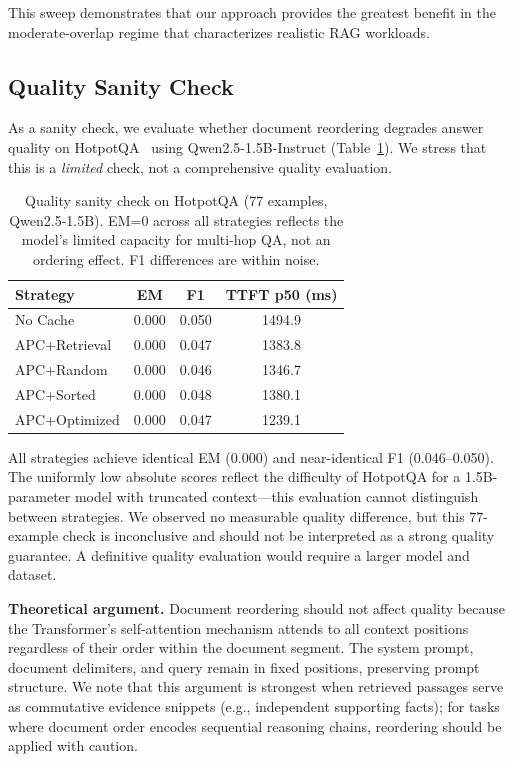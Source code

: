 \documentclass{article}
\begin{document}
This sweep demonstrates that our approach provides the greatest benefit in the moderate-overlap regime that characterizes realistic RAG workloads.

\subsection{Quality Sanity Check}

As a sanity check, we evaluate whether document reordering degrades answer quality on HotpotQA~\citep{yang2018hotpotqa} using Qwen2.5-1.5B-Instruct (Table~\ref{tab:quality}). We stress that this is a \emph{limited} check, not a comprehensive quality evaluation.

\begin{table}[t]
\caption{Quality sanity check on HotpotQA (77 examples, Qwen2.5-1.5B). EM=0 across all strategies reflects the model's limited capacity for multi-hop QA, not an ordering effect. F1 differences are within noise.}
\label{tab:quality}
\centering
\small
\begin{tabular}{@{}lccc@{}}
\toprule
\textbf{Strategy} & \textbf{EM} & \textbf{F1} & \textbf{TTFT p50 (ms)} \\
\midrule
No Cache      & 0.000 & 0.050 & 1494.9 \\
APC+Retrieval & 0.000 & 0.047 & 1383.8 \\
APC+Random    & 0.000 & 0.046 & 1346.7 \\
APC+Sorted    & 0.000 & 0.048 & 1380.1 \\
APC+Optimized & 0.000 & 0.047 & 1239.1 \\
\bottomrule
\end{tabular}
\vspace{-0.5em}
\end{table}

All strategies achieve identical EM (0.000) and near-identical F1 (0.046--0.050). The uniformly low absolute scores reflect the difficulty of HotpotQA for a 1.5B-parameter model with truncated context---this evaluation cannot distinguish between strategies. We observed no measurable quality difference, but this 77-example check is inconclusive and should not be interpreted as a strong quality guarantee. A definitive quality evaluation would require a larger model and dataset.

\textbf{Theoretical argument.} Document reordering should not affect quality because the Transformer's self-attention mechanism attends to all context positions regardless of their order within the document segment. The system prompt, document delimiters, and query remain in fixed positions, preserving prompt structure. We note that this argument is strongest when retrieved passages serve as commutative evidence snippets (e.g., independent supporting facts); for tasks where document order encodes sequential reasoning chains, reordering should be applied with caution.
\end{document}

